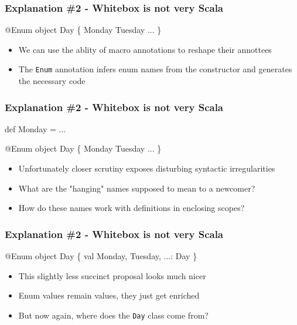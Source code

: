 \documentclass[svgnames,hyperref={bookmarks=false}]{beamer}
\begin{document}
\begin{frame}[fragile]
\frametitle{Explanation \#2 - Whitebox is not very Scala}

\begin{semiverbatim}
\alert{@Enum}
object Day \{
  Monday
  Tuesday
  ...
\}

\end{semiverbatim}

\begin{itemize}
\item We can use the ablity of macro annotations to reshape their annottees
\item The \texttt{Enum} annotation infers enum names from the constructor and generates the necessary code
\end{itemize}
\end{frame}

\begin{frame}[fragile]
\frametitle{Explanation \#2 - Whitebox is not very Scala}

\begin{semiverbatim}
def Monday = ...

\alert{@Enum}
object Day \{
  Monday
  Tuesday
  ...
\}

\end{semiverbatim}

\begin{itemize}
\item Unfortunately closer scrutiny exposes disturbing syntactic irregularities
\item What are the "hanging" names supposed to mean to a newcomer?
\item How do these names work with definitions in enclosing scopes?
\end{itemize}
\end{frame}

\begin{frame}[fragile]
\frametitle{Explanation \#2 - Whitebox is not very Scala}

\begin{semiverbatim}
\alert{@Enum}
object Day \{
  val Monday, Tuesday, ...: Day
\}

\end{semiverbatim}

\begin{itemize}
\item This slightly less succinct proposal looks much nicer
\item Enum values remain values, they just get enriched
\item But now again, where does the \texttt{Day} class come from?
\end{itemize}
\end{frame}
\end{document}

